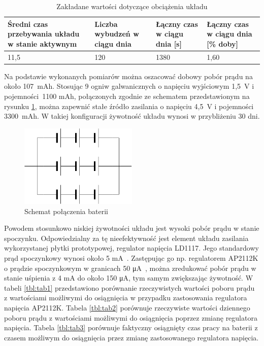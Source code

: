         \begin{table}[]
            \caption{Zakładane wartości dotyczące obciążenia układu}
            \centering
            \begin{tabular}{p{4cm}|p{3cm}|p{3cm}|p{3cm}}
                    \textbf{Średni czas przebywania układu w stanie aktywnym} & \textbf{Liczba wybudzeń w ciągu dnia} & \textbf{Łączny czas w ciągu dnia [s]} & \textbf{Łączny czas w ciągu dnia [\% doby]} \\ \hline
                     11,5 & 120 & 1380 & 1,60 \\
            \end{tabular}
            \label{tbl:tab4}
            \vspace{10mm}
        \end{table}

        Na podstawie wykonanych pomiarów można oszacować dobowy pobór prądu na około 107~mAh. Stosując 9 ogniw galwanicznych o napięciu wyjściowym 1,5~V i pojemności~1100 mAh, połączonych zgodnie ze schematem przedstawionym na rysunku \ref{fig:battery_layout}, można zapewnić stałe źródło zasilania o napięciu 4,5~V i pojemności 3300~mAh. W takiej konfiguracji żywotność układu wynosi w przybliżeniu 30 dni.

        \begin{figure}[]
            \centering
            \includegraphics[width=0.5\textwidth]{chapters/images/battery_layout.png}
            \caption{Schemat połączenia baterii}
            \label{fig:battery_layout}
        \end{figure}

        Powodem stosunkowo niskiej żywotności układu jest wysoki pobór prądu w stanie spoczynku. Odpowiedzialny za tę nieefektywność jest element układu zasilania wykorzystanej płytki prototypowej, regulator napięcia LD1117. Jego standardowy prąd spoczynkowy wynosi około 5 mA~\cite{AMS1117-ds}. Zastępując go np. regulatorem AP2112K o prądzie spoczynkowym w granicach 50 μA~\cite{AP2112K-ds}, można zredukować pobór prądu w stanie uśpienia z 4 mA do około 150 μA, tym samym zwiększając żywotność. W tabeli \ref{tbl:tab1} przedstawiono porównanie rzeczywistych wartości poboru prądu z wartościami możliwymi do osiągnięcia w przypadku zastosowania regulatora napięcia AP2112K. Tabela \ref{tbl:tab2} porównuje rzeczywiste wartości dziennego poboru prądu z wartościami możliwymi do osiągnięcia poprzez zmianę regulatora napięcia. Tabela \ref{tbl:tab3} porównuje faktyczny osiągnięty czas pracy na baterii z czasem możliwym do osiągnięcia przez zmianę zastosowanego regulatora napięcia.


